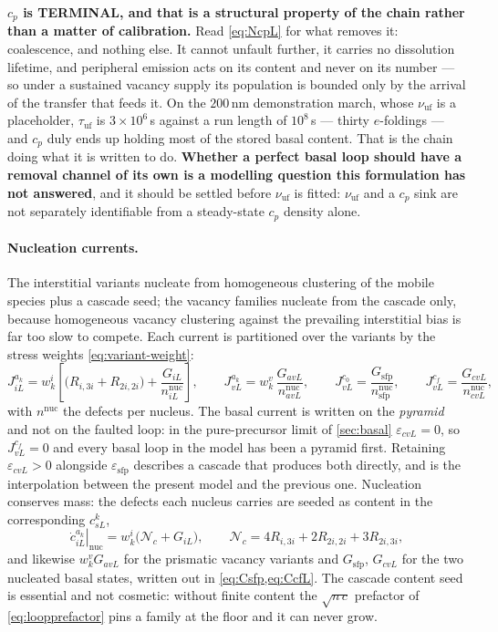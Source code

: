 \documentclass{article}
\begin{document}
\textbf{$c_p$ is TERMINAL, and that is a structural property of the chain rather
than a matter of calibration.} Read \cref{eq:NcpL} for what removes it:
coalescence, and nothing else. It cannot unfault further, it carries no
dissolution lifetime, and peripheral emission acts on its content and never on
its number --- so under a sustained vacancy supply its population is bounded only
by the arrival of the transfer that feeds it. On the $200$\,nm demonstration
march, whose $\nu_{\mathrm{uf}}$ is a placeholder, $\tau_{\mathrm{uf}}$ is
$3\times10^{6}$\,s against a run length of $10^{8}$\,s --- thirty $e$-foldings ---
and $c_p$ duly ends up holding most of the stored basal content. That is the
chain doing what it is written to do. \textbf{Whether a perfect basal loop should
have a removal channel of its own is a modelling question this formulation has
not answered}, and it should be settled before $\nu_{\mathrm{uf}}$ is fitted:
$\nu_{\mathrm{uf}}$ and a $c_p$ sink are not separately identifiable from a
steady-state $c_p$ density alone.


\paragraph{Nucleation currents.} The interstitial variants nucleate from
homogeneous clustering of the mobile species plus a cascade seed; the vacancy
families nucleate from the cascade only, because homogeneous vacancy clustering
against the prevailing interstitial bias is far too slow to compete. Each current
is partitioned over the variants by the stress weights \cref{eq:variant-weight}:
\begin{equation}
  J^{a_k}_{iL}=w^i_k\left[\bigl(R_{i,3i}+R_{2i,2i}\bigr)
                 +\frac{G_{iL}}{n^{\mathrm{nuc}}_{iL}}\right],
  \qquad
  J^{a_k}_{vL}=w^v_k\,\frac{G_{avL}}{n^{\mathrm{nuc}}_{avL}},
  \qquad
  J^{c_0}_{vL}=\frac{G_{\mathrm{sfp}}}{n^{\mathrm{nuc}}_{\mathrm{sfp}}},
  \qquad
  J^{c_f}_{vL}=\frac{G_{cvL}}{n^{\mathrm{nuc}}_{cvL}} ,
  \label{eq:nucleation}
\end{equation}
with $n^{\mathrm{nuc}}$ the defects per nucleus. The basal current is written on
the \emph{pyramid} and not on the faulted loop: in the pure-precursor limit of
\cref{sec:basal} $\varepsilon_{cvL}=0$, so $J^{c_f}_{vL}=0$ and every basal loop
in the model has been a pyramid first. Retaining $\varepsilon_{cvL}>0$ alongside
$\varepsilon_{\mathrm{sfp}}$ describes a cascade that produces both directly, and
is the interpolation between the present model and the previous one. Nucleation conserves mass: the
defects each nucleus carries are seeded as content in the corresponding
$c^k_{sL}$,
\begin{equation}
  \left.\dot c^{a_k}_{iL}\right|_{\mathrm{nuc}}
    =w^i_k\bigl(\mathcal N_c+G_{iL}\bigr),
  \qquad
  \mathcal N_c=4R_{i,3i}+2R_{2i,2i}+3R_{2i,3i},
  \label{eq:nuccontent}
\end{equation}
and likewise $w^v_kG_{avL}$ for the prismatic vacancy variants and
$G_{\mathrm{sfp}}$, $G_{cvL}$ for the two nucleated basal states, written out in
\cref{eq:Csfp,eq:CcfL}. The cascade
content seed is essential and not cosmetic: without finite content the
$\sqrt{n\,c}$ prefactor of \cref{eq:loopprefactor} pins a family at the floor and
it can never grow.
\end{document}
